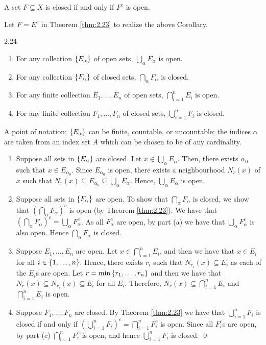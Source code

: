 \begin{ncorollary}{}{}
    A set $F \subseteq X$ is closed if and only if $F^c$ is open.
\end{ncorollary}
\noindent Let $F = E^c$ in Theorem \ref{thm:2.23} to realize the above Corollary.

\begin{theorem}{}{2.24}
    \begin{enumerate}
        \item For any collection $\set{E_\alpha}$ of open sets, $\bigcup_\alpha E_\alpha$ is open.
        \item For any collection $\set{F_\alpha}$ of closed sets, $\bigcap_\alpha F_\alpha$ is closed.
        \item For any finite collection $E_1, \ldots, E_n$ of open sets, $\bigcap_{i=1}^n E_i$ is open.
        \item For any finite collection $F_1, \ldots, F_n$ of closed sets, $\bigcup_{i=1}^n F_i$ is closed.
    \end{enumerate}
\end{theorem}
\noindent A point of notation; $\set{E_\alpha}$ can be finite, countable, or uncountable; the indices $\alpha$ are taken from an index set $A$ which can be chosen to be of any cardinality. 
\begin{nproof}
    \begin{enumerate}
        \item Suppose all sets in $\set{E_\alpha}$ are closed. Let $x \in \bigcup_{\alpha}E_\alpha$. Then, there exists $\alpha_0$ such that $x \in E_{\alpha_0}$. Since $E_{\alpha_0}$ is open, there exists a neighbourhood $N_r(x)$ of $x$ such that $N_r(x) \subseteq E_{\alpha_0} \subseteq \bigcup_{\alpha} E_\alpha$. Hence, $\bigcup_{\alpha} E_\alpha$ is open.
        \item Suppose all sets in $\set{F_\alpha}$ are open. To show that $\bigcap_\alpha F_\alpha$ is closed, we show that $\left(\bigcap_\alpha F_\alpha\right)^c$ is open (by Theorem \ref{thm:2.23}). We have that $\left(\bigcap_\alpha F_\alpha\right)^c = \bigcup_\alpha F_\alpha^c$. As all $F_\alpha^c$ are open, by part (a) we have that $\bigcup_\alpha F_\alpha^c$ is also open. Hence $\bigcap_\alpha F_\alpha$ is closed.
        \item Suppose $E_1,\ldots, E_n$ are open. Let $x \in \bigcap_{i=1}^n E_i$, and then we have that $x \in E_i$ for all $i \in \set{1, \ldots, n}$. Hence, there exists $r_i$ such that $N_{r_i}(x) \subseteq E_i$ as each of the $E_i$s are open. Let $r = \min\set{r_1, \ldots, r_n}$ and then we have that $N_r(x) \subseteq N_{r_i}(x) \subseteq E_i$ for all $E_i$. Therefore, $N_r(x) \subseteq \bigcap_{i=1}^n E_i$ and $\bigcap_{i=1}^n E_i$ is open.
        \item Suppose $F_1, \ldots, F_n$ are closed. By Theorem \ref{thm:2.23} we have that $\bigcup_{i=1}^n F_i$ is closed if and only if $\left(\bigcup_{i=1}^n F_i\right)^c = \bigcap_{i=1}^n F_i^c$ is open. Since all $F_i^c$s are open, by part (c) $\bigcap_{i=1}^n F_i^c$ is open, and hence $\bigcup_{i=1}^n F_i$ is closed. \qed
    \end{enumerate}
\end{nproof}


